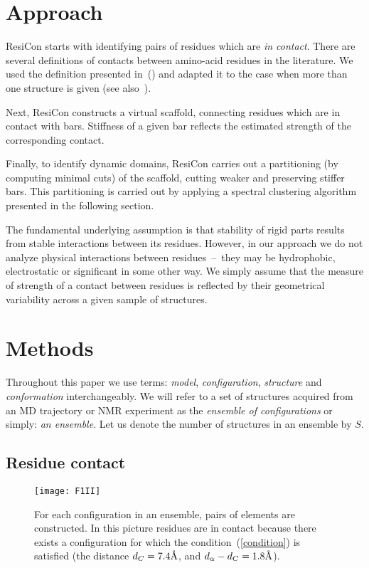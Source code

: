 \section{Approach} 
ResiCon starts with identifying pairs of residues which are \emph{in contact}.
There are several definitions of contacts between amino-acid residues in the literature.
We used the definition presented in~(\cite{daniluk2011novel}) and adapted it to the case when more than one structure is given (see also~\cite{daniluk2014theoretical}).

Next, ResiCon constructs a virtual scaffold, connecting residues which are in contact with bars.
Stiffness of a given bar reflects the estimated strength of the corresponding contact. 

Finally, to identify dynamic domains, ResiCon carries out a partitioning (by computing minimal cuts) of the scaffold, cutting weaker and preserving stiffer bars.
This partitioning is carried out by applying a spectral clustering algorithm presented in the following section.

The fundamental underlying assumption is that stability of rigid parts results from stable interactions between its residues.
However, in our approach we do not analyze physical interactions between residues~--~they may be hydrophobic, electrostatic or significant in some other way.
We simply assume that the measure of strength of a contact between residues is reflected by their geometrical variability across a given sample of structures.

\section{Methods}
Throughout this paper we use terms: \emph{model}, \emph{configuration}, \emph{structure} and \emph{conformation} interchangeably.
We will refer to a set of structures acquired from an MD trajectory or NMR experiment as the \emph{ensemble of configurations} or simply: \emph{an ensemble}.
Let us denote the number of structures in an ensemble by $S$.

\subsection*{Residue contact}
\begin{figure}
\centering
\texttt{[image: F1II]}
\caption{
For each configuration in an ensemble, pairs of elements are constructed.
In this picture residues are in contact because there exists a configuration for which the condition~(\ref{condition}) is satisfied (the distance $d_C=7.4\mbox{\normalfont\AA}$, and $d_\alpha-d_C = 1.8\mbox{\normalfont\AA}$).
}
\label{contact}
\end{figure}

